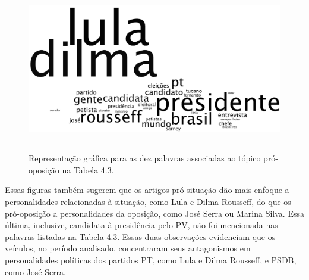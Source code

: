 \begin{figure}[h]
  \centering %
  \includegraphics[width=12.5cm, height=6.5cm]{oposicao.png}\\
  \caption{Representação gráfica para as dez palavras associadas ao tópico pró-oposição na Tabela 4.3.}
  \label{oposicao}
\end{figure}




Essas figuras também sugerem que os artigos pró-situação dão mais enfoque a personalidades relacionadas à situação, como Lula e Dilma Rousseff, do que os pró-oposição a personalidades da oposição, como José Serra ou Marina Silva. Essa última, inclusive, candidata à presidência pelo PV, não foi mencionada nas palavras listadas na Tabela 4.3. Essas duas observações evidenciam que os veículos, no período analisado, concentraram seus antagonismos em personalidades políticas dos partidos PT, como Lula e Dilma Rousseff, e PSDB, como José Serra.


